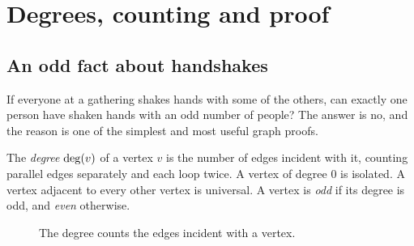 \chapter{Degrees, counting and proof}
\section*{An odd fact about handshakes}
If everyone at a gathering shakes hands with some of the others, can exactly one person have shaken hands with an odd number of people? The answer is no, and the reason is one of the simplest and most useful graph proofs.

\begin{definition}
The \emph{degree} $\operatorname{deg}(v)$ of a vertex $v$ is the number of edges incident with it, counting parallel edges separately and each loop twice. A vertex of degree 0 is isolated. A vertex adjacent to every other vertex is universal. A vertex is \emph{odd} if its degree is odd, and \emph{even} otherwise.
\end{definition}

\begin{figure}[htbp]
\centering
{}
\caption{The degree counts the edges incident with a vertex.}
\end{figure}

